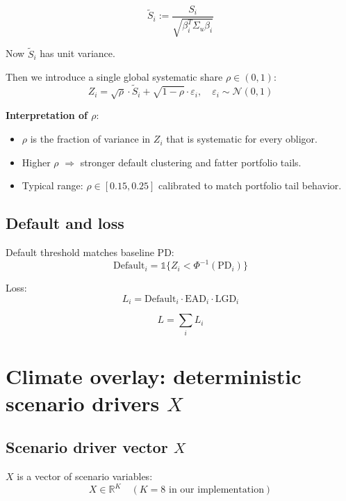 \documentclass[11pt,a4paper]{article}
\begin{document}
\begin{equation}
\tilde{S}_i := \frac{S_i}{\sqrt{\beta_i^T \Sigma_u \beta_i}}
\end{equation}

Now $\tilde{S}_i$ has unit variance.

Then we introduce a single global systematic share $\rho \in (0,1)$:
\begin{equation}
Z_i = \sqrt{\rho} \cdot \tilde{S}_i + \sqrt{1-\rho} \cdot \varepsilon_i, \quad \varepsilon_i \sim \mathcal{N}(0,1)
\end{equation}

\textbf{Interpretation of $\rho$}:
\begin{itemize}
    \item $\rho$ is the fraction of variance in $Z_i$ that is systematic for every obligor.
    \item Higher $\rho$ $\Rightarrow$ stronger default clustering and fatter portfolio tails.
    \item Typical range: $\rho \in [0.15, 0.25]$ calibrated to match portfolio tail behavior.
\end{itemize}

\subsection{Default and loss}

Default threshold matches baseline PD:
\begin{equation}
\text{Default}_i = \mathbb{1}\{Z_i < \Phi^{-1}(\text{PD}_i)\}
\end{equation}

Loss:
\begin{equation}
L_i = \text{Default}_i \cdot \text{EAD}_i \cdot \text{LGD}_i
\end{equation}

\begin{equation}
L = \sum_i L_i
\end{equation}

\section{Climate overlay: deterministic scenario drivers $X$}

\subsection{Scenario driver vector $X$}

$X$ is a vector of scenario variables:
\begin{equation}
X \in \mathbb{R}^K \quad (K = 8 \text{ in our implementation})
\end{equation}
\end{document}
